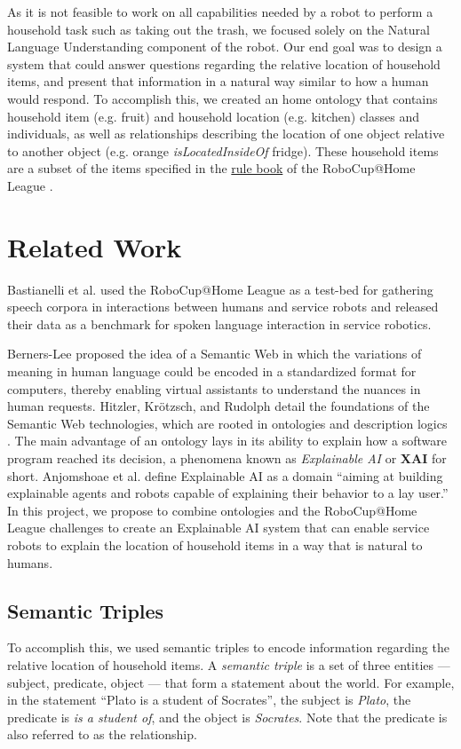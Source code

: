 \documentclass{article}
\begin{document}
As it is not feasible to work on all capabilities needed by a robot to 
perform a household task such as taking out the trash, we focused solely on 
the Natural Language Understanding component of the robot. Our end goal was to
design a system that could answer questions regarding the relative location of
household items, and present that information in a natural way similar to how
a human would respond. To accomplish this, we created an home ontology that 
contains household item (e.g. fruit) and household location (e.g. kitchen)
classes and individuals, as well as relationships describing the location
of one object relative to another object 
(e.g. orange \textit{isLocatedInsideOf} fridge).
These household items are a subset of the items specified in the 
\href{http://www.sharelatex.com}{rule book} of the RoboCup@Home League 
\cite{RobocupAtHome2015}.

\section{Related Work}\label{related}
Bastianelli et al. \cite{BastianelliEtAl2014} used the RoboCup@Home League as
a test-bed for gathering speech corpora in interactions between humans and 
service robots and released their data as a benchmark for spoken language 
interaction in service robotics.

Berners-Lee \cite{bernerslee2001semantic} proposed the idea of a Semantic Web
in which the variations of meaning in human language could be encoded in a 
standardized format for computers, thereby enabling virtual assistants
to understand the nuances in human requests. Hitzler, Krötzsch, and Rudolph
detail the foundations of the Semantic Web technologies, which are rooted in
ontologies and description logics \cite{2009HitzlerBook}. The main advantage
of an ontology lays in its ability to explain how a software program reached
its decision, a phenomena known as \textit{Explainable AI} or \textbf{XAI}
for short. Anjomshoae et al. \cite{AnjomshoaeEtAl2019} define Explainable AI
as a domain ``aiming at building explainable agents and robots capable of 
explaining their behavior to a lay user.'' In this project, we propose to 
combine ontologies and the RoboCup@Home League challenges to create an 
Explainable AI system that can enable service robots to explain the location 
of household items in a way that is natural to humans.

\subsection{Semantic Triples}
To accomplish this, we used semantic triples to encode information regarding
the relative location of household items. A \textit{semantic triple} is a set 
of three entities --- subject, predicate, object --- 
that form a statement about the world. For example, in the statement 
``Plato is a student of Socrates'', the subject is \textit{Plato}, the 
predicate is \textit{is a student of}, and the object is \textit{Socrates}.
Note that the predicate is also referred to as the relationship.
\end{document}
